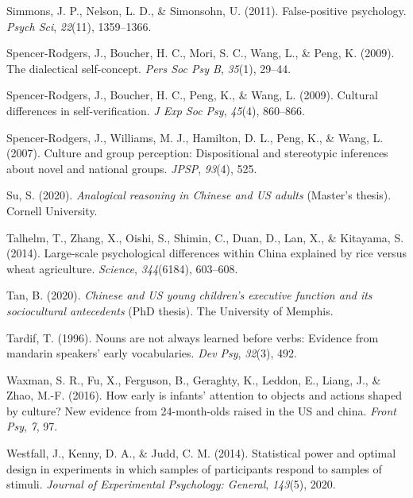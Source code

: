\documentclass[
  man,floatsintext]{apa6}
\newlength{\cslhangindent}
\newlength{\cslentryspacingunit} %
\newenvironment{CSLReferences}[2] %
 {%
  \setlength{\parindent}{0pt}
  \ifodd #1
  \let\oldpar\par
  \def\par{\hangindent=\cslhangindent\oldpar}
  \fi
  \setlength{\parskip}{#2\cslentryspacingunit}
 }%
 {}
\begin{document}
\begin{CSLReferences}{1}{0}
\leavevmode{}%
Simmons, J. P., Nelson, L. D., \& Simonsohn, U. (2011). False-positive psychology. \emph{Psych Sci}, \emph{22}(11), 1359--1366.

\leavevmode{}%
Spencer-Rodgers, J., Boucher, H. C., Mori, S. C., Wang, L., \& Peng, K. (2009). The dialectical self-concept. \emph{Pers Soc Psy B}, \emph{35}(1), 29--44.

\leavevmode{}%
Spencer-Rodgers, J., Boucher, H. C., Peng, K., \& Wang, L. (2009). Cultural differences in self-verification. \emph{J Exp Soc Psy}, \emph{45}(4), 860--866.

\leavevmode{}%
Spencer-Rodgers, J., Williams, M. J., Hamilton, D. L., Peng, K., \& Wang, L. (2007). Culture and group perception: Dispositional and stereotypic inferences about novel and national groups. \emph{JPSP}, \emph{93}(4), 525.

\leavevmode{}%
Su, S. (2020). \emph{Analogical reasoning in {C}hinese and {US} adults} (Master's thesis). Cornell University.

\leavevmode{}%
Talhelm, T., Zhang, X., Oishi, S., Shimin, C., Duan, D., Lan, X., \& Kitayama, S. (2014). Large-scale psychological differences within {C}hina explained by rice versus wheat agriculture. \emph{Science}, \emph{344}(6184), 603--608.

\leavevmode{}%
Tan, B. (2020). \emph{Chinese and US young children's executive function and its sociocultural antecedents} (PhD thesis). The University of Memphis.

\leavevmode{}%
Tardif, T. (1996). Nouns are not always learned before verbs: Evidence from mandarin speakers' early vocabularies. \emph{Dev Psy}, \emph{32}(3), 492.

\leavevmode{}%
Waxman, S. R., Fu, X., Ferguson, B., Geraghty, K., Leddon, E., Liang, J., \& Zhao, M.-F. (2016). How early is infants' attention to objects and actions shaped by culture? New evidence from 24-month-olds raised in the US and china. \emph{Front Psy}, \emph{7}, 97.

\leavevmode{}%
Westfall, J., Kenny, D. A., \& Judd, C. M. (2014). Statistical power and optimal design in experiments in which samples of participants respond to samples of stimuli. \emph{Journal of Experimental Psychology: General}, \emph{143}(5), 2020.


\end{CSLReferences}
\end{document}
